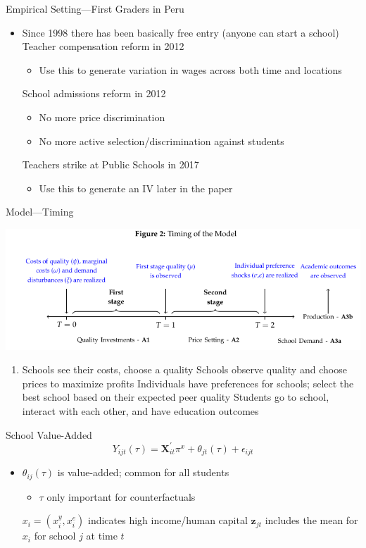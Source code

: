 \documentclass[dvipsnames]{beamer}
\begin{document}
\begin{frame}{Empirical Setting---First Graders in Peru}
  \begin{itemize}
  \item Since 1998 there has been basically free entry (anyone can start a school)
    \vitem Teacher compensation reform in 2012
    \begin{itemize}
    \item Use this to generate variation in wages across both time and locations
    \end{itemize}
    \vitem School admissions reform in 2012
    \begin{itemize}
    \item No more price discrimination
      \item No more active selection/discrimination against students
    \end{itemize}
    \vitem Teachers strike at Public Schools in 2017
    \begin{itemize}
    \item Use this to generate an IV later in the paper
    \end{itemize}
  \end{itemize}
\end{frame}
%
\begin{frame}{Model---Timing}
  \begin{center}
   \includegraphics[width=\textwidth, keepaspectratio=true]{figs/fig2.png} 
  \end{center}
  \begin{enumerate}
  \item Schools see their costs, choose a quality
    \vitem Schools observe quality and choose prices to maximize profits
    \vitem Individuals have preferences for schools; select the best school based on their expected peer quality
    \vitem Students go to school, interact with each other, and have education outcomes
  \end{enumerate}
\end{frame}
%
\begin{frame}{School Value-Added}
  \[
 Y_{i j t}(\tau)=\mathbf{X}_{i t}^{\prime} \pi^{x}+\theta_{j t}(\tau)+\epsilon_{i j t} 
 \]
 \begin{itemize}
 \item $\theta_{ij}(\tau)$ is value-added; common for all students
   \begin{itemize}
   \item $\tau$ only important for counterfactuals
   \end{itemize}
   \vitem $x_i = (x_i^y, x_i^e)$ indicates high income/human capital
   \vitem $\mathbf{z}_{jt}$ includes the mean for $x_i$ for school $j$ at time $t$
 \end{itemize}
\end{frame}
\end{document}
